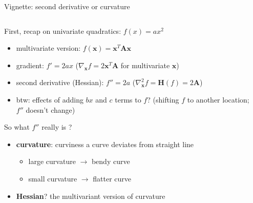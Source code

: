 \documentclass[ignorenonframetext,aspectratio=169]{beamer}
\newcommand{\vv}[1]{\boldsymbol{#1}}
\newcommand{\empha}[1]{\textbf{\textcolor{stablue}{#1}}}
\begin{document}
\begin{frame}{Vignette: second derivative or curvature}
\protect\hypertarget{vignette-second-derivative-or-curvature}{}

\begin{columns}

\begin{column}{0.7\textwidth}
First, recap on univariate quadratics: $f({x}) = ax^2$
\begin{itemize}
\item multivariate version: $f(\vv{x})= \vv{x}^T\vv{Ax}$
\item gradient: $f'=2ax$ ($\nabla_{\vv{x}}f=2\vv{x}^T\vv{A}$ for multivariate $\vv{x}$)
\item second derivative (Hessian): $f''=2a$  ($\nabla^2_{\vv{x}}f=\vv{H}(f)=2\vv{A}$)
\item btw: effects of adding $bx$ and $c$ terms to $f$? (shifting $f$ to another location; $f''$ doesn't change)
\end{itemize}

So what $f''$ really is ?

\begin{itemize}
\item \empha{curvature}: curviness a curve deviates from straight line
\begin{itemize}
\item large curvature $\rightarrow$ bendy curve
\item small curvature $\rightarrow$ flatter curve 
\end{itemize}
\item \empha{Hessian}? the multivariant version of curvature
\end{itemize}
    
\end{column}

\begin{column}{0.3\textwidth}


\end{column}
\end{columns}
\end{frame}
\end{document}
